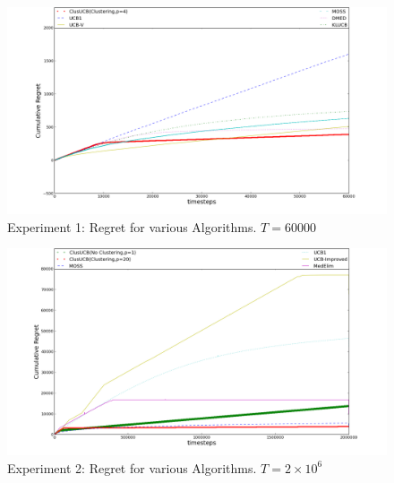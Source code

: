 




\begin{figure}[!tbp]
\label{fig:1}
\begin{minipage}[b]{0.5\textwidth}
\includegraphics[width=\textwidth]{img/ClusUCB_variousAlgo.png}

\caption{Experiment 1: Regret for various Algorithms. $T=60000$}
\end{minipage}
\end{figure}

\hspace{0.1em}

\begin{figure}[!tbp]
\label{fig:2}
\begin{minipage}[b]{0.5\textwidth}

\includegraphics[width=\textwidth]{img/clusUCB_variousAlgo(expt2)_3.png}
\caption{Experiment 2: Regret for various Algorithms. $T=2\times 10^{6}$}
\end{minipage}
\end{figure}

